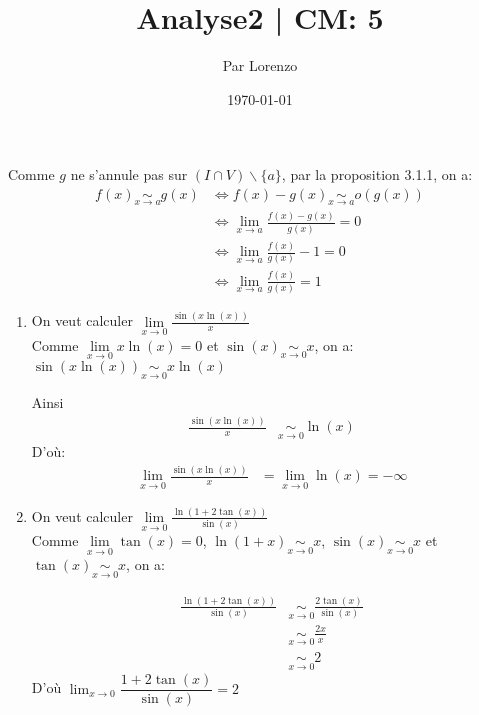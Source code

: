 \documentclass[a4paper, 12pt]{article}
\title{Analyse2 | CM: 5}
\author{Par Lorenzo}
\date{\today}
\begin{document}
\maketitle


\begin{demonstration}
    Comme $g$ ne s'annule pas sur $(I \cap V)\backslash\{a\}$, par la proposition 3.1.1, on a:
    \begin{align*}
        f(x) \underset{x \to a}{\sim} g(x) &\iff f(x) - g(x) \underset{x \to a}{\sim} o(g(x)) \\
        &\iff \lim\limits_{x \to a}\frac{f(x) - g(x)}{g(x)} = 0 \\
        &\iff \lim\limits_{x \to a}\frac{f(x)}{g(x)} - 1 = 0 \\
        &\iff \lim\limits_{x \to a}\frac{f(x)}{g(x)} = 1
    \end{align*}
\end{demonstration}

\begin{example}
    \begin{enumerate}
        \item On veut calculer $\lim\limits_{x \to 0}\frac{\sin(x\ln(x))}{x}$\\
        Comme $\lim\limits_{x \to 0}x\ln(x) = 0$ et $\sin(x) \underset{x \to 0}{\sim} x$, on a:
        $\sin(x\ln(x)) \underset{x \to 0}{\sim} x\ln(x)$

        Ainsi 
        \begin{align*}
            \frac{\sin(x\ln(x))}{x} &\underset{x \to 0}{\sim} \ln(x)
        \end{align*}
        D'où:
        \begin{align*}
            \lim\limits_{x \to 0}\frac{\sin(x\ln(x))}{x} &= \lim\limits_{x \to 0}\ln(x) = -\infty
        \end{align*}
        
        \item On veut calculer $\lim\limits_{x \to 0}\frac{\ln(1 + 2\tan(x))}{\sin(x)}$\\
        Comme $\lim\limits_{x \to 0}\tan(x) = 0$, $\ln(1 + x) \underset{x \to 0}{\sim} x$, $\sin(x) \underset{x \to 0}{\sim} x$ et $\tan(x) \underset{x \to 0}{\sim} x$, on a:
        
        \begin{align*}
            \frac{\ln(1 + 2\tan(x))}{\sin(x)} &\underset{x \to 0}{\sim} \frac{2\tan(x)}{\sin(x)} \\
            &\underset{x \to 0}{\sim} \frac{2x}{x} \\
            &\underset{x \to 0}{\sim} 2
        \end{align*}
        D'où $\lim_{x \to 0}\dfrac{1 + 2\tan(x)}{\sin(x)} = 2$
    \end{enumerate}
\end{example}
\end{document}
